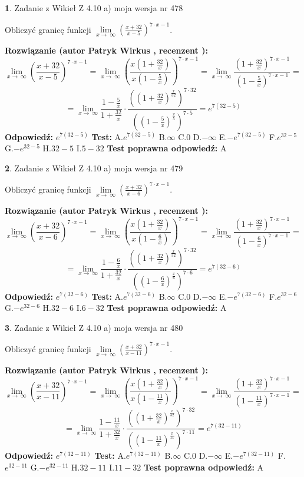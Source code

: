\documentclass[12pt, a4paper]{article}
\theoremstyle{definition} %
\newtheorem{zad}{}
\newcommand{\zadStart}[1]{\begin{zad}#1\newline}
\newcommand{\zadStop}{\end{zad}}
\newcommand{\rozwStart}[2]{\noindent \textbf{Rozwiązanie (autor #1 , recenzent #2): }\newline}
\newcommand{\rozwStop}{\newline}
\newcommand{\odpStart}{\noindent \textbf{Odpowiedź:}\newline}
\newcommand{\odpStop}{\newline}
\newcommand{\testStart}{\noindent \textbf{Test:}\newline}
\newcommand{\testStop}{\newline}
\newcommand{\kluczStart}{\noindent \textbf{Test poprawna odpowiedź:}\newline}
\newcommand{\kluczStop}{\newline}
\begin{document}
\zadStart{Zadanie z Wikieł Z 4.10 a) moja wersja nr 478}


Obliczyć granicę funkcji  $\lim\limits_{x\to\ \infty}(\frac{x+32}{x-5})^{7\cdot x-1}$.
\zadStop
\rozwStart{Patryk Wirkus}{}
$$\lim\limits_{x\to\ \infty}(\frac{x+32}{x-5})^{7\cdot x-1} = \lim\limits_{x\to\ \infty}(\frac{x(1+\frac{32}{x})}{x(1-\frac{5}{x})})^{7\cdot x-1}=\lim\limits_{x\to\ \infty}\frac{(1+\frac{32}{x})^{7\cdot x-1}}{(1-\frac{5}{x})^{7\cdot x-1}}=$$
$$=\lim\limits_{x\to\ \infty}\frac{1-\frac{5}{x}}{1+\frac{32}{x}}\cdot\frac{((1+\frac{32}{x})^{\frac{x}{32}})^{7\cdot32}}{((1-\frac{5}{x})^{\frac{x}{5}})^{7\cdot5}}=e^{7(32-5)}$$
\rozwStop
\odpStart
$e^{7(32-5)}$
\odpStop
\testStart
A.$e^{7(32-5)}$ B.$\infty$ C.$0$ D.$-\infty$ E.$-e^{7(32-5)}$
F.$e^{32-5}$ G.$-e^{32-5}$
H.$32-5$
I.$5-32$
\testStop
\kluczStart
A
\kluczStop



\zadStart{Zadanie z Wikieł Z 4.10 a) moja wersja nr 479}


Obliczyć granicę funkcji  $\lim\limits_{x\to\ \infty}(\frac{x+32}{x-6})^{7\cdot x-1}$.
\zadStop
\rozwStart{Patryk Wirkus}{}
$$\lim\limits_{x\to\ \infty}(\frac{x+32}{x-6})^{7\cdot x-1} = \lim\limits_{x\to\ \infty}(\frac{x(1+\frac{32}{x})}{x(1-\frac{6}{x})})^{7\cdot x-1}=\lim\limits_{x\to\ \infty}\frac{(1+\frac{32}{x})^{7\cdot x-1}}{(1-\frac{6}{x})^{7\cdot x-1}}=$$
$$=\lim\limits_{x\to\ \infty}\frac{1-\frac{6}{x}}{1+\frac{32}{x}}\cdot\frac{((1+\frac{32}{x})^{\frac{x}{32}})^{7\cdot32}}{((1-\frac{6}{x})^{\frac{x}{6}})^{7\cdot6}}=e^{7(32-6)}$$
\rozwStop
\odpStart
$e^{7(32-6)}$
\odpStop
\testStart
A.$e^{7(32-6)}$ B.$\infty$ C.$0$ D.$-\infty$ E.$-e^{7(32-6)}$
F.$e^{32-6}$ G.$-e^{32-6}$
H.$32-6$
I.$6-32$
\testStop
\kluczStart
A
\kluczStop



\zadStart{Zadanie z Wikieł Z 4.10 a) moja wersja nr 480}


Obliczyć granicę funkcji  $\lim\limits_{x\to\ \infty}(\frac{x+32}{x-11})^{7\cdot x-1}$.
\zadStop
\rozwStart{Patryk Wirkus}{}
$$\lim\limits_{x\to\ \infty}(\frac{x+32}{x-11})^{7\cdot x-1} = \lim\limits_{x\to\ \infty}(\frac{x(1+\frac{32}{x})}{x(1-\frac{11}{x})})^{7\cdot x-1}=\lim\limits_{x\to\ \infty}\frac{(1+\frac{32}{x})^{7\cdot x-1}}{(1-\frac{11}{x})^{7\cdot x-1}}=$$
$$=\lim\limits_{x\to\ \infty}\frac{1-\frac{11}{x}}{1+\frac{32}{x}}\cdot\frac{((1+\frac{32}{x})^{\frac{x}{32}})^{7\cdot32}}{((1-\frac{11}{x})^{\frac{x}{11}})^{7\cdot11}}=e^{7(32-11)}$$
\rozwStop
\odpStart
$e^{7(32-11)}$
\odpStop
\testStart
A.$e^{7(32-11)}$ B.$\infty$ C.$0$ D.$-\infty$ E.$-e^{7(32-11)}$
F.$e^{32-11}$ G.$-e^{32-11}$
H.$32-11$
I.$11-32$
\testStop
\kluczStart
A
\kluczStop
\end{document}
